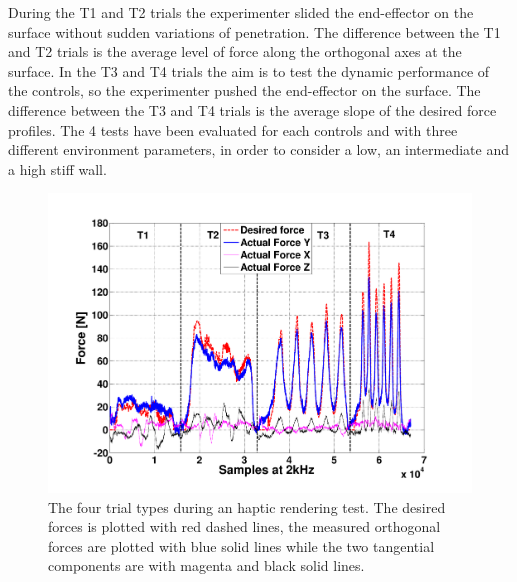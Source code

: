 \documentclass[journal]{IEEEtran}
\begin{document}
During the T1 and T2 trials the experimenter slided the end-effector on the surface without sudden variations of penetration. The difference between the T1 and T2 trials is the average level of force along the orthogonal axes at the surface.
In the T3 and T4 trials the aim is to test the dynamic performance of the controls, so the experimenter pushed the end-effector on the surface. The difference between the T3 and T4 trials is the average slope of the desired force profiles.
The 4 tests have been evaluated for each controls and with three different environment parameters, in order to consider a low, an intermediate and a high stiff wall. 
\begin{figure}[htb]
	\centering
	\includegraphics[width=1\columnwidth]{proveRendering}
	\caption{The four trial types during an haptic rendering test. The desired forces is plotted with red dashed lines, the measured orthogonal forces are plotted with blue solid lines while the two tangential components are with magenta and black solid lines.}
	\label{fig:renderingTestType}
\end{figure}
\end{document}
